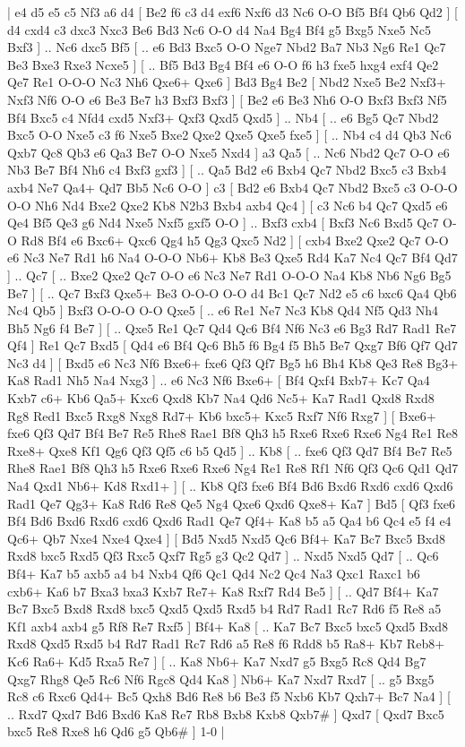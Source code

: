 \makegametitle 
|   e4   d5    e5   c5    Nf3   a6    d4 [  Be2 f6  c3 d4  exf6 Nxf6  d3 Nc6  O-O Bf5  Bf4 Qb6  Qd2   ]  [  d4 cxd4  c3 dxc3  Nxc3 Be6  Bd3 Nc6  O-O d4  Na4 Bg4  Bf4 g5  Bxg5 Nxe5  Nc5 Bxf3   ] .. Nc6    dxc5   Bf5 [ .. e6  Bd3 Bxc5  O-O Nge7  Nbd2 Ba7  Nb3 Ng6  Re1 Qc7  Be3 Bxe3  Rxe3 Ncxe5   ]  [ .. Bf5  Bd3 Bg4  Bf4 e6  O-O f6  h3 fxe5  hxg4 exf4  Qe2 Qe7  Re1 O-O-O  Nc3 Nh6  Qxe6+ Qxe6   ]  Bd3   Bg4    Be2 [  Nbd2 Nxe5  Be2 Nxf3+  Nxf3 Nf6  O-O e6  Be3 Be7  h3 Bxf3  Bxf3   ]  [  Be2 e6  Be3 Nh6  O-O Bxf3  Bxf3 Nf5  Bf4 Bxc5  c4 Nfd4  cxd5 Nxf3+  Qxf3 Qxd5  Qxd5   ] .. Nb4 [ .. e6  Bg5 Qc7  Nbd2 Bxc5  O-O Nxe5  c3 f6  Nxe5 Bxe2  Qxe2 Qxe5  Qxe5 fxe5   ]  [ .. Nb4  c4 d4  Qb3 Nc6  Qxb7 Qc8  Qb3 e6  Qa3 Be7  O-O Nxe5  Nxd4   ]  a3   Qa5 [ .. Nc6  Nbd2 Qc7  O-O e6  Nb3 Be7  Bf4 Nh6  c4 Bxf3  gxf3   ]  [ .. Qa5  Bd2 e6  Bxb4 Qc7  Nbd2 Bxc5  c3 Bxb4  axb4 Ne7  Qa4+ Qd7  Bb5 Nc6  O-O   ]  c3 [  Bd2 e6  Bxb4 Qc7  Nbd2 Bxc5  c3 O-O-O  O-O Nh6  Nd4 Bxe2  Qxe2 Kb8  N2b3 Bxb4  axb4 Qc4   ]  [  c3 Nc6  b4 Qc7  Qxd5 e6  Qe4 Bf5  Qe3 g6  Nd4 Nxe5  Nxf5 gxf5  O-O   ] .. Bxf3    cxb4 [  Bxf3 Nc6  Bxd5 Qc7  O-O Rd8  Bf4 e6  Bxc6+ Qxc6  Qg4 h5  Qg3 Qxc5  Nd2   ]  [  cxb4 Bxe2  Qxe2 Qc7  O-O e6  Nc3 Ne7  Rd1 h6  Na4 O-O-O  Nb6+ Kb8  Be3 Qxe5  Rd4 Ka7  Nc4 Qc7  Bf4 Qd7   ] .. Qc7 [ .. Bxe2  Qxe2 Qc7  O-O e6  Nc3 Ne7  Rd1 O-O-O  Na4 Kb8  Nb6 Ng6  Bg5 Be7   ]  [ .. Qc7  Bxf3 Qxe5+  Be3 O-O-O  O-O d4  Bc1 Qc7  Nd2 e5  c6 bxc6  Qa4 Qb6  Nc4 Qb5   ]  Bxf3   O-O-O    O-O   Qxe5 [ .. e6  Re1 Ne7  Nc3 Kb8  Qd4 Nf5  Qd3 Nh4  Bh5 Ng6  f4 Be7   ]  [ .. Qxe5  Re1 Qc7  Qd4 Qc6  Bf4 Nf6  Nc3 e6  Bg3 Rd7  Rad1 Re7  Qf4   ]  Re1   Qc7    Bxd5 [  Qd4 e6  Bf4 Qc6  Bh5 f6  Bg4 f5  Bh5 Be7  Qxg7 Bf6  Qf7 Qd7  Nc3 d4   ]  [  Bxd5 e6  Nc3 Nf6  Bxe6+ fxe6  Qf3 Qf7  Bg5 h6  Bh4 Kb8  Qe3 Re8  Bg3+ Ka8  Rad1 Nh5  Na4 Nxg3   ] .. e6    Nc3   Nf6    Bxe6+ [  Bf4 Qxf4  Bxb7+ Kc7  Qa4 Kxb7  c6+ Kb6  Qa5+ Kxc6  Qxd8 Kb7  Na4 Qd6  Nc5+ Ka7  Rad1 Qxd8  Rxd8 Rg8  Red1 Bxc5  Rxg8 Nxg8  Rd7+ Kb6  bxc5+ Kxc5  Rxf7 Nf6  Rxg7   ]  [  Bxe6+ fxe6  Qf3 Qd7  Bf4 Be7  Re5 Rhe8  Rae1 Bf8  Qh3 h5  Rxe6 Rxe6  Rxe6 Ng4  Re1 Re8  Rxe8+ Qxe8  Kf1 Qg6  Qf3 Qf5  c6 b5  Qd5   ] .. Kb8 [ .. fxe6  Qf3 Qd7  Bf4 Be7  Re5 Rhe8  Rae1 Bf8  Qh3 h5  Rxe6 Rxe6  Rxe6 Ng4  Re1 Re8  Rf1 Nf6  Qf3 Qc6  Qd1 Qd7  Na4 Qxd1  Nb6+ Kd8  Rxd1+   ]  [ .. Kb8  Qf3 fxe6  Bf4 Bd6  Bxd6 Rxd6  cxd6 Qxd6  Rad1 Qe7  Qg3+ Ka8  Rd6 Re8  Qe5 Ng4  Qxe6 Qxd6  Qxe8+ Ka7   ]  Bd5 [  Qf3 fxe6  Bf4 Bd6  Bxd6 Rxd6  cxd6 Qxd6  Rad1 Qe7  Qf4+ Ka8  b5 a5  Qa4 b6  Qc4 e5  f4 e4  Qc6+ Qb7  Nxe4 Nxe4  Qxe4   ]  [  Bd5 Nxd5  Nxd5 Qc6  Bf4+ Ka7  Bc7 Bxc5  Bxd8 Rxd8  bxc5 Rxd5  Qf3 Rxc5  Qxf7 Rg5  g3 Qc2  Qd7   ] .. Nxd5    Nxd5   Qd7 [ .. Qc6  Bf4+ Ka7  b5 axb5  a4 b4  Nxb4 Qf6  Qc1 Qd4  Nc2 Qc4  Na3 Qxc1  Raxc1 b6  cxb6+ Ka6  b7 Bxa3  bxa3 Kxb7  Re7+ Ka8  Rxf7 Rd4  Be5   ]  [ .. Qd7  Bf4+ Ka7  Bc7 Bxc5  Bxd8 Rxd8  bxc5 Qxd5  Qxd5 Rxd5  b4 Rd7  Rad1 Rc7  Rd6 f5  Re8 a5  Kf1 axb4  axb4 g5  Rf8 Re7  Rxf5   ]  Bf4+   Ka8 [ .. Ka7  Bc7 Bxc5  bxc5 Qxd5  Bxd8 Rxd8  Qxd5 Rxd5  b4 Rd7  Rad1 Rc7  Rd6 a5  Re8 f6  Rdd8 b5  Ra8+ Kb7  Reb8+ Kc6  Ra6+ Kd5  Rxa5 Re7   ]  [ .. Ka8  Nb6+ Ka7  Nxd7 g5  Bxg5 Rc8  Qd4 Bg7  Qxg7 Rhg8  Qe5 Rc6  Nf6 Rgc8  Qd4 Ka8   ]  Nb6+   Ka7   Nxd7   Rxd7 [ .. g5  Bxg5 Rc8  c6 Rxc6  Qd4+ Bc5  Qxh8 Bd6  Re8 b6  Be3 f5  Nxb6 Kb7  Qxh7+ Bc7  Na4   ]  [ .. Rxd7  Qxd7 Bd6  Bxd6 Ka8  Re7 Rb8  Bxb8 Kxb8  Qxb7#   ]  Qxd7    [  Qxd7 Bxc5  bxc5 Re8  Rxe8 h6  Qd6 g5  Qb6#   ] 1-0  |
